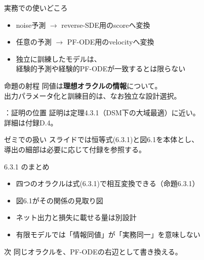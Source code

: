 \asmain
\begin{frame}{実務での使いどころ}
    \begin{itemize}
        \item noise予測 $\to$ reverse-SDE用のscoreへ変換
        \item 任意の予測 $\to$ PF-ODE用のvelocityへ変換
        \item 独立に訓練したモデルは、\\
        経験的予測や経験的PF-ODEが一致するとは限らない
    \end{itemize}
    \begin{alertblock}{命題の射程}
        同値は\textbf{理想オラクルの情報}について。\\
        出力パラメータ化と訓練目的は、なお独立な設計選択。
    \end{alertblock}
\end{frame}
\assuppl
\begin{frame}{\supplmark：証明の位置}
    証明は定理4.3.1（DSM下の大域最適）に近い。\\
    詳細は付録D.4。
    \begin{exampleblock}{ゼミでの扱い}
        スライドでは恒等式(6.3.1)と図6.1を本体とし、\\
        導出の細部は必要に応じて付録を参照する。
    \end{exampleblock}
\end{frame}
\asmain
\begin{frame}{6.3.1 のまとめ}
    \begin{itemize}
        \item 四つのオラクルは式(6.3.1)で相互変換できる（命題6.3.1）
        \item 図6.1がその関係の見取り図
        \item ネット出力と損失に載せる量は別設計
        \item 有限モデルでは「情報同値」が「実務同一」を意味しない
    \end{itemize}
    \begin{block}{次}
        同じオラクルを、PF-ODEの右辺として書き換える。
    \end{block}
\end{frame}
